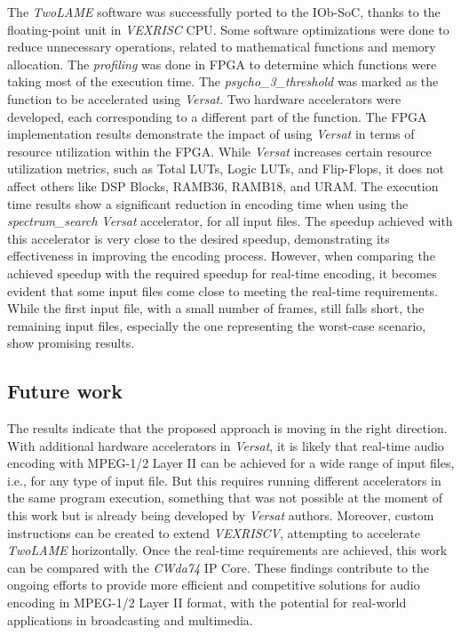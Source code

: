 The \textit{TwoLAME} software was successfully ported to the IOb-SoC, thanks to the floating-point unit in \textit{VEXRISC} CPU.
Some software optimizations were done to reduce unnecessary operations, related to mathematical functions and memory allocation.
The \textit{profiling} was done in FPGA to determine which functions were taking most of the execution time. The \textit{psycho\_3\_threshold} was marked as the function to be accelerated using \textit{Versat}.
Two hardware accelerators were developed, each corresponding to a different part of the function.
The FPGA implementation results demonstrate the impact of using \textit{Versat} in terms of resource utilization within the FPGA. While \textit{Versat} increases certain resource utilization metrics, such as Total LUTs, Logic LUTs, and Flip-Flops, it does not affect others like DSP Blocks, RAMB36, RAMB18, and URAM.
The execution time results show a significant reduction in encoding time when using the \textit{spectrum\_search} \textit{Versat} accelerator, for all input files. The speedup achieved with this accelerator is very close to the desired speedup, demonstrating its effectiveness in improving the encoding process.
However, when comparing the achieved speedup with the required speedup for real-time encoding, it becomes evident that some input files come close to meeting the real-time requirements. While the first input file, with a small number of frames, still falls short, the remaining input files, especially the one representing the worst-case scenario, show promising results.

\subsection{Future work}

The results indicate that the proposed approach is moving in the right direction. With additional hardware accelerators in \textit{Versat}, it is likely that real-time audio encoding with MPEG-1/2 Layer II can be achieved for a wide range of input files, i.e., for any type of input file. But this requires running different accelerators in the same program execution, something that was not possible at the moment of this work but is already being developed by \textit{Versat} authors. 
Moreover, custom instructions can be created to extend \textit{VEXRISCV}, attempting to accelerate \textit{TwoLAME} horizontally.
Once the real-time requirements are achieved, this work can be compared with the  \textit{CWda74} IP Core.
These findings contribute to the ongoing efforts to provide more efficient and competitive solutions for audio encoding in MPEG-1/2 Layer II format, with the potential for real-world applications in broadcasting and multimedia.